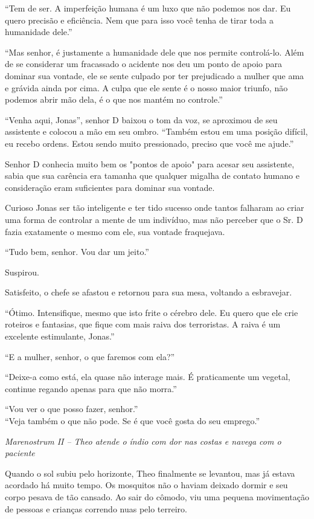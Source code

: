 ``Tem de ser. A imperfeição humana é um luxo que não podemos nos dar. Eu
quero precisão e eficiência. Nem que para isso você tenha de tirar toda
a humanidade dele.''

``Mas senhor, é justamente a humanidade dele que nos permite
controlá-lo. Além de se considerar um fracassado o acidente nos deu um
ponto de apoio para dominar sua vontade, ele se sente culpado por ter
prejudicado a mulher que ama e grávida ainda por cima. A culpa que ele
sente é o nosso maior triunfo, não podemos abrir mão dela, é o que nos
mantém no controle.''

``Venha aqui, Jonas'', senhor D baixou o tom da voz, se aproximou de seu
assistente e colocou a mão em seu ombro. ``Também estou em uma posição
difícil, eu recebo ordens. Estou sendo muito pressionado, preciso que
você me ajude.''

Senhor D conhecia muito bem os "pontos de apoio" para acesar seu
assistente, sabia que sua carência era tamanha que qualquer migalha de
contato humano e consideração eram suficientes para dominar sua vontade.

Curioso Jonas ser tão inteligente e ter tido sucesso onde tantos
falharam ao criar uma forma de controlar a mente de um indivíduo, mas
não perceber que o Sr. D fazia exatamente o mesmo com ele, sua vontade
fraquejava.

``Tudo bem, senhor. Vou dar um jeito.''

Suspirou.

Satisfeito, o chefe se afastou e retornou para sua mesa, voltando a
esbravejar.

``Ótimo. Intensifique, mesmo que isto frite o cérebro dele. Eu quero que
ele crie roteiros e fantasias, que fique com mais raiva dos terroristas.
A raiva é um excelente estimulante, Jonas.''

``E a mulher, senhor, o que faremos com ela?''

``Deixe-a como está, ela quase não interage mais. É praticamente um
vegetal, continue regando apenas para que não morra.''

``Vou ver o que posso fazer, senhor.''\\
``Veja também o que não pode. Se é que você gosta do seu emprego.''

\asterisc

\emph{Marenostrum II -- Theo atende o índio com dor nas costas e navega com o paciente}

Quando o sol subiu pelo horizonte, Theo finalmente se levantou, mas já
estava acordado há muito tempo. Os mosquitos não o haviam deixado dormir
e seu corpo pesava de tão cansado. Ao sair do cômodo, viu uma pequena
movimentação de pessoas e crianças correndo nuas pelo terreiro.

